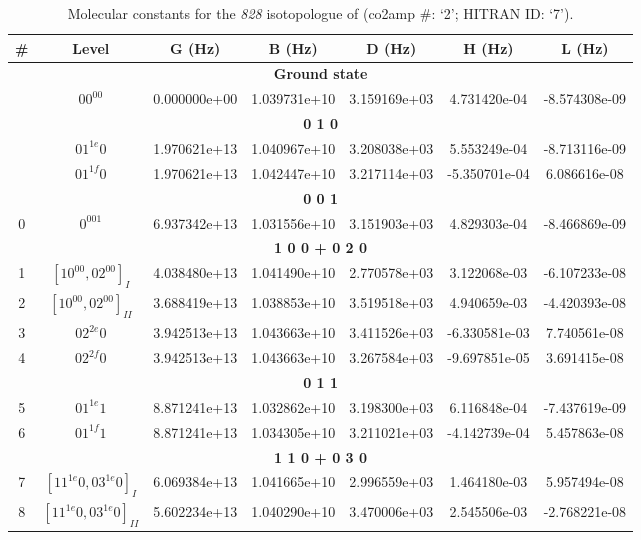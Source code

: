 \begin{table}[h!]
\caption{Molecular constants for the \textit{828} isotopologue of  (co2amp \#: ‘2’; HITRAN ID: ‘7’).}
\label{table:constants_828}
\centering
\begin{tabular}{|c|c|c|c|c|c|c|}
\hline
\textbf{\#} & \textbf{Level} & \textbf{G (Hz)} & \textbf{B (Hz)} & \textbf{D (Hz)} & \textbf{H (Hz)} & \textbf{L (Hz)} \\ \hline
\multicolumn{7}{|c|}{\textbf{Ground state}} \\ \hline
 & $00^00$ & 0.000000e+00 & 1.039731e+10 & 3.159169e+03 & 4.731420e-04 & -8.574308e-09 \\ \hline
\multicolumn{7}{|c|}{\textbf{0 1 0}} \\ \hline
 & $01^{1e}0$ & 1.970621e+13 & 1.040967e+10 & 3.208038e+03 & 5.553249e-04 & -8.713116e-09 \\ \hline
 & $01^{1f}0$ & 1.970621e+13 & 1.042447e+10 & 3.217114e+03 & -5.350701e-04 & 6.086616e-08 \\ \hline
\multicolumn{7}{|c|}{\textbf{0 0 1}} \\ \hline
0 & $0^001$ & 6.937342e+13 & 1.031556e+10 & 3.151903e+03 & 4.829303e-04 & -8.466869e-09 \\ \hline
\multicolumn{7}{|c|}{\textbf{1 0 0 + 0 2 0}} \\ \hline
1 & $[10^00, 02^00]_{I}$ & 4.038480e+13 & 1.041490e+10 & 2.770578e+03 & 3.122068e-03 & -6.107233e-08 \\ \hline
2 & $[10^00, 02^00]_{II}$ & 3.688419e+13 & 1.038853e+10 & 3.519518e+03 & 4.940659e-03 & -4.420393e-08 \\ \hline
3 & $02^{2e}0$ & 3.942513e+13 & 1.043663e+10 & 3.411526e+03 & -6.330581e-03 & 7.740561e-08 \\ \hline
4 & $02^{2f}0$ & 3.942513e+13 & 1.043663e+10 & 3.267584e+03 & -9.697851e-05 & 3.691415e-08 \\ \hline
\multicolumn{7}{|c|}{\textbf{0 1 1}} \\ \hline
5 & $01^{1e}1$ & 8.871241e+13 & 1.032862e+10 & 3.198300e+03 & 6.116848e-04 & -7.437619e-09 \\ \hline
6 & $01^{1f}1$ & 8.871241e+13 & 1.034305e+10 & 3.211021e+03 & -4.142739e-04 & 5.457863e-08 \\ \hline
\multicolumn{7}{|c|}{\textbf{1 1 0 + 0 3 0}} \\ \hline
7 & $[11^{1e}0, 03^{1e}0]_{I}$ & 6.069384e+13 & 1.041665e+10 & 2.996559e+03 & 1.464180e-03 & 5.957494e-08 \\ \hline
8 & $[11^{1e}0, 03^{1e}0]_{II}$ & 5.602234e+13 & 1.040290e+10 & 3.470006e+03 & 2.545506e-03 & -2.768221e-08 \\ \hline

\end{tabular}
\end{table}

